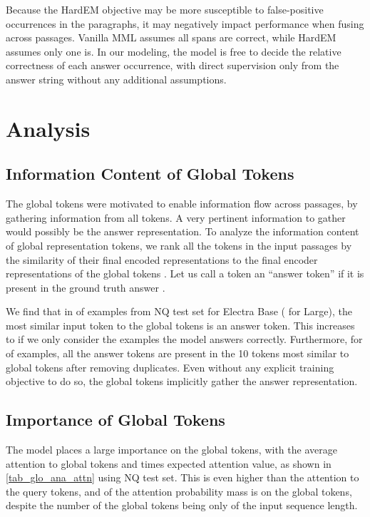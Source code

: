 \documentclass[11pt]{article}
\begin{document}
Because the HardEM objective may be more susceptible to false-positive occurrences in the paragraphs, it may negatively impact performance when fusing across passages. Vanilla MML assumes all spans are correct, while HardEM assumes only one is. In our modeling, the model is free to decide the relative correctness of each answer occurrence, with direct supervision only from the answer string without any additional assumptions.


 \section{Analysis}

\subsection{Information Content of Global Tokens}

The global tokens were motivated to enable information flow across passages, by gathering information from all tokens. A very pertinent information to gather would possibly be the answer representation. To analyze the information content of global representation tokens, we rank all the tokens  in the input passages by the similarity of their final encoded representations  to the final encoder representations of the global tokens . Let us call a token an ``answer token'' if it is present in the ground truth answer . 

We find that in  of examples from NQ test set for Electra Base ( for Large), the most similar input token to the global tokens is an answer token. This increases to  if we only consider the examples the model answers correctly. Furthermore, for  of examples, all the answer tokens are present in the 10 tokens most similar to global tokens after removing duplicates. Even without any explicit training objective to do so, the global tokens implicitly gather the answer representation.

\subsection{Importance of Global Tokens}

The model places a large importance on the global tokens, with the average attention to global tokens  and  times expected attention value, as shown in \cref{tab_glo_ana_attn} using NQ test set. This is even higher than the attention to the query tokens, and  of the attention probability mass is on the global tokens, despite the number of the global tokens being only  of the input sequence length.  
\end{document}
